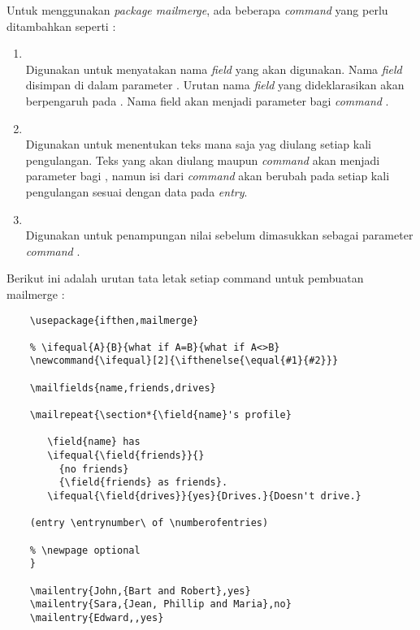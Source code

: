 Untuk menggunakan \textit{package mailmerge}, ada beberapa \textit{command} yang perlu ditambahkan seperti \cite{Frasson:2009} :
\begin{enumerate}
	\item \texttt{\string\mailfields}\\
	Digunakan untuk menyatakan nama \textit{field} yang akan digunakan. Nama \textit{field} disimpan di dalam parameter \texttt{\string\mailfields}. Urutan nama \textit{field} yang dideklarasikan akan berpengaruh pada \texttt{\string\mailentry}. Nama field akan menjadi parameter bagi \textit{command} \texttt{\string\field}.
	\item \texttt{\string\mailrepeat}\\
	Digunakan untuk menentukan teks mana saja yag diulang setiap kali pengulangan. Teks yang akan diulang maupun \textit{command} \texttt{\string\field} akan menjadi parameter bagi \texttt{\string\mailrepeat}, namun isi dari \textit{command} \texttt{\string\field} akan berubah pada setiap kali pengulangan sesuai dengan data pada \textit{entry}.
	\item \texttt{\string\mailentry}\\
	Digunakan untuk penampungan nilai sebelum dimasukkan sebagai parameter \textit{command} \texttt{\string\field}.
\end{enumerate}
	Berikut ini adalah urutan tata letak setiap command untuk pembuatan mailmerge :
	\begin{verbatim}
    \usepackage{ifthen,mailmerge}

    % \ifequal{A}{B}{what if A=B}{what if A<>B}
    \newcommand{\ifequal}[2]{\ifthenelse{\equal{#1}{#2}}}

    \mailfields{name,friends,drives}

    \mailrepeat{\section*{\field{name}'s profile}

       \field{name} has
       \ifequal{\field{friends}}{}
         {no friends}
         {\field{friends} as friends}.
       \ifequal{\field{drives}}{yes}{Drives.}{Doesn't drive.}

    (entry \entrynumber\ of \numberofentries)

    % \newpage optional
    }

    \mailentry{John,{Bart and Robert},yes}
    \mailentry{Sara,{Jean, Phillip and Maria},no}
    \mailentry{Edward,,yes}
 \end{verbatim}